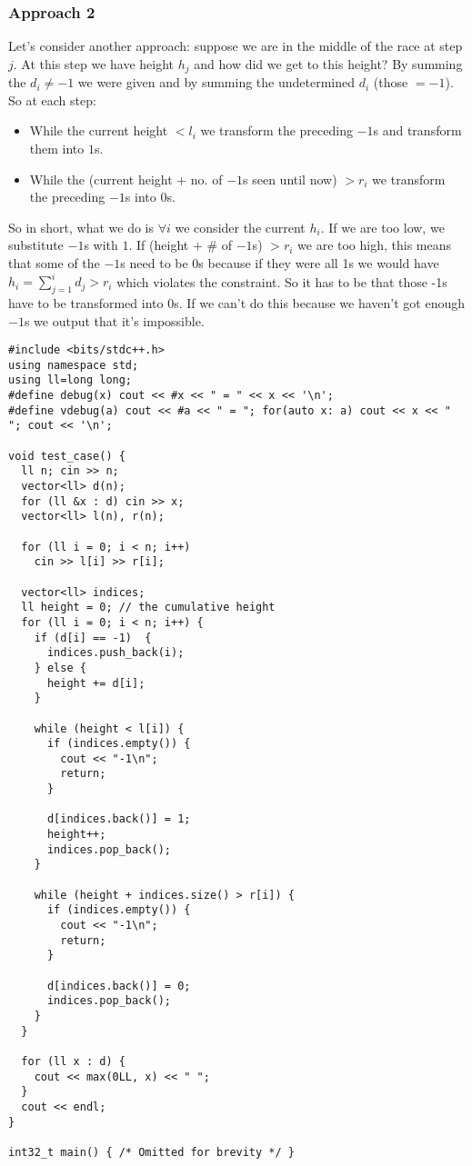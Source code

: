 \subsubsection{Approach 2}
Let's consider another approach: suppose we are in the middle of the race at step $j$. At this step we have height $h_j$ and how did we get to this height? By summing the $d_i \neq -1$ we were given and by summing the undetermined $d_i$ (those $= -1$). So at each step:
\begin{itemize}
    \item While the current height $< l_i$ we transform the preceding $-1$s and transform them into $1$s.
    \item While the (current height + no. of $-1$s seen until now) $> r_i$ we transform the preceding $-1$s into $0$s. 
\end{itemize}


So in short, what we do is $\forall i$ we consider the current $h_i$. If we are too low, we substitute $-1$s with $1$. If (height + \# of $-1$s) $> r_i$ we are too high, this means that some of the $-1$s need to be 0s because if they were all 1s we would have $h_i = \sum_{j=1}^{i}{d_j} > r_i$ which violates the constraint. So it has to be that those -1s have to be transformed into 0s. If we can't do this because we haven't got enough $-1$s we output that it's impossible.

\begin{verbatim}
#include <bits/stdc++.h>
using namespace std;
using ll=long long;
#define debug(x) cout << #x << " = " << x << '\n';
#define vdebug(a) cout << #a << " = "; for(auto x: a) cout << x << " "; cout << '\n';
 
void test_case() {
  ll n; cin >> n;
  vector<ll> d(n);
  for (ll &x : d) cin >> x;
  vector<ll> l(n), r(n);
 
  for (ll i = 0; i < n; i++)
    cin >> l[i] >> r[i];
  
  vector<ll> indices;
  ll height = 0; // the cumulative height
  for (ll i = 0; i < n; i++) {
    if (d[i] == -1)  {
      indices.push_back(i);
    } else {
      height += d[i];
    }
 
    while (height < l[i]) {
      if (indices.empty()) {
        cout << "-1\n";
        return;
      }
 
      d[indices.back()] = 1;
      height++;
      indices.pop_back();
    }
 
    while (height + indices.size() > r[i]) {
      if (indices.empty()) {
        cout << "-1\n";
        return;
      }
 
      d[indices.back()] = 0;
      indices.pop_back();
    }
  }
 
  for (ll x : d) {
    cout << max(0LL, x) << " ";
  }
  cout << endl;
}
 
int32_t main() { /* Omitted for brevity */ }
\end{verbatim}

